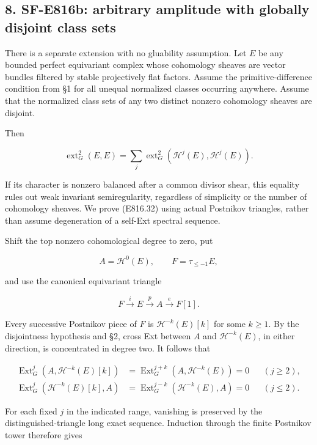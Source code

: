 \subsection{8. SF-E816b: arbitrary amplitude with globally disjoint
class
sets}\label{SF-E816-sf-e816b-arbitrary-amplitude-with-globally-disjoint-class-sets}

There is a separate extension with no gluability assumption. Let \(E\)
be any bounded perfect equivariant complex whose cohomology sheaves are
vector bundles filtered by stable projectively flat factors. Assume the
primitive-difference condition from §1 for all unequal normalized
classes occurring anywhere. Assume that the normalized class sets of any
two distinct nonzero cohomology sheaves are disjoint.

Then

\[
 \operatorname{ext}^2_G(E,E)
      =\sum_j\operatorname{ext}^2_G(\mathcal H^j(E),\mathcal H^j(E)).
 \tag{E816.32}
\]

If its character is nonzero balanced after a common divisor shear, this
equality rules out weak invariant semiregularity, regardless of
simplicity or the number of cohomology sheaves. We prove (E816.32) using
actual Postnikov triangles, rather than assume degeneration of a
self-Ext spectral sequence.

Shift the top nonzero cohomological degree to zero, put

\[
 A=\mathcal H^0(E),\qquad F=\tau_{\le-1}E,
\]

and use the canonical equivariant triangle

\[
 F\xrightarrow{i}E\xrightarrow{p}A\xrightarrow{e}F[1].
 \tag{E816.33}
\]

Every successive Postnikov piece of \(F\) is \(\mathcal H^{-k}(E)[k]\)
for some \(k\ge1\). By the disjointness hypothesis and §2, cross Ext
between \(A\) and \(\mathcal H^{-k}(E)\), in either direction, is
concentrated in degree two. It follows that

\[
 \begin{split}
 \operatorname{Ext}^j_G(A,\mathcal H^{-k}(E)[k])
       &=\operatorname{Ext}^{j+k}_G(A,\mathcal H^{-k}(E))=0
              &&(j\ge2),\\
 \operatorname{Ext}^j_G(\mathcal H^{-k}(E)[k],A)
       &=\operatorname{Ext}^{j-k}_G(\mathcal H^{-k}(E),A)=0
              &&(j\le2).
 \end{split}
 \tag{E816.34}
\]

For each fixed \(j\) in the indicated range, vanishing is preserved by
the distinguished-triangle long exact sequence. Induction through the
finite Postnikov tower therefore gives

